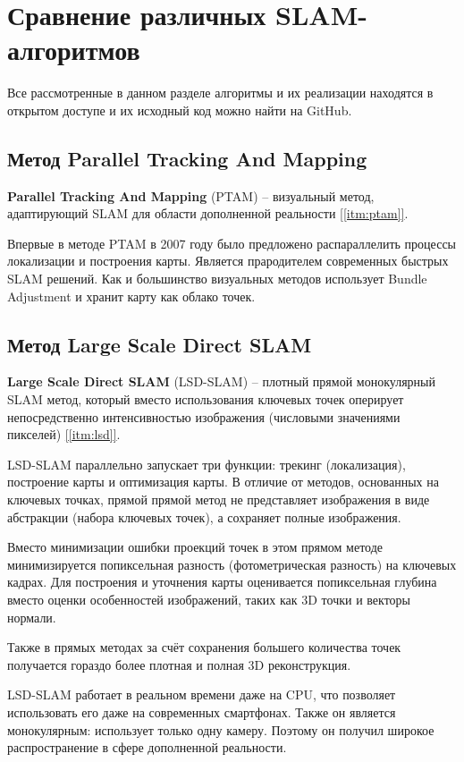 \section{Сравнение различных SLAM-алгоритмов}

Все рассмотренные в данном разделе алгоритмы и их реализации находятся в открытом доступе и их исходный код можно найти на GitHub.

\subsection{Метод Parallel Tracking And Mapping}
\textbf{Parallel Tracking And Mapping} (PTAM) -- визуальный метод, адаптирующий SLAM для области дополненной реальности \hyperref[itm:ptam]{[\ref{itm:ptam}]}.

Впервые в методе PTAM в 2007 году было предложено распараллелить процессы локализации и построения карты. Является прародителем современных быстрых SLAM решений. Как и большинство визуальных методов использует Bundle Adjustment и хранит карту как облако точек.

\subsection{Метод Large Scale Direct SLAM}
\textbf{Large Scale Direct SLAM} (LSD-SLAM) -- плотный прямой монокулярный SLAM метод, который вместо использования ключевых точек оперирует непосредственно интенсивностью изображения (числовыми значениями пикселей) \hyperref[itm:lsd]{[\ref{itm:lsd}]}.

LSD-SLAM параллельно запускает три функции: трекинг (локализация), построение карты и оптимизация карты. В отличие от методов, основанных на ключевых точках, прямой прямой метод не представляет изображения в виде абстракции (набора ключевых точек), а сохраняет полные изображения.

Вместо минимизации ошибки проекций точек в этом прямом методе минимизируется попиксельная разность (фотометрическая разность) на ключевых кадрах. Для построения и уточнения карты оценивается попиксельная глубина вместо оценки особенностей изображений, таких как 3D точки и векторы нормали.

Также в прямых методах за счёт сохранения большего количества точек получается гораздо более плотная и полная 3D реконструкция.

LSD-SLAM работает в реальном времени даже на CPU, что позволяет использовать его даже на современных смартфонах. Также он является монокулярным: использует только одну камеру. Поэтому он получил широкое распространение в сфере дополненной реальности.

